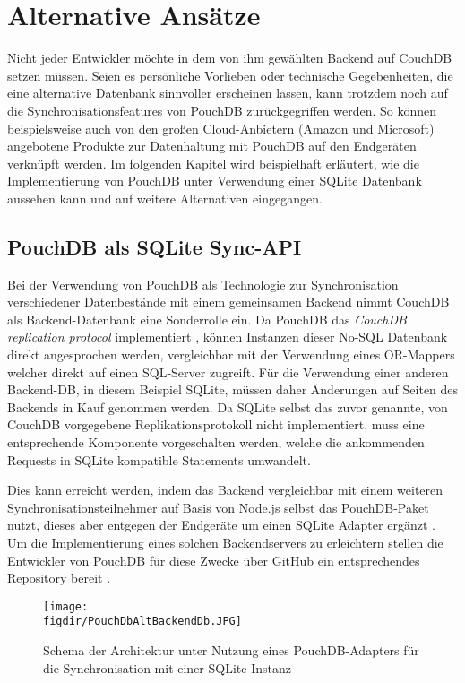 \chapter{Alternative Ansätze}
\label{Alternative Ansätze}

Nicht jeder Entwickler möchte in dem von ihm gewählten Backend auf CouchDB setzen müssen. Seien es persönliche Vorlieben oder technische Gegebenheiten, die eine alternative Datenbank sinnvoller erscheinen lassen, kann trotzdem noch auf die Synchronisationsfeatures von PouchDB zurückgegriffen werden. So können beispielsweise auch von den großen Cloud-Anbietern (Amazon und Microsoft) angebotene Produkte zur Datenhaltung mit PouchDB auf den Endgeräten verknüpft werden. Im folgenden Kapitel wird beispielhaft erläutert, wie die Implementierung von PouchDB unter Verwendung einer SQLite Datenbank aussehen kann und auf weitere Alternativen eingegangen.

\section{PouchDB als SQLite Sync-API}
Bei der Verwendung von PouchDB als Technologie zur Synchronisation verschiedener Datenbestände mit einem gemeinsamen Backend nimmt CouchDB als Backend-Datenbank eine Sonderrolle ein. Da PouchDB das \emph{CouchDB replication protocol} implementiert \cite{pouch:syncnoncouchdb}, können Instanzen dieser No-SQL Datenbank direkt angesprochen werden, vergleichbar mit der Verwendung eines OR-Mappers welcher direkt auf einen SQL-Server zugreift. Für die Verwendung einer anderen Backend-DB, in diesem Beispiel SQLite, müssen daher Änderungen auf Seiten des Backends in Kauf genommen werden. Da SQLite selbst das zuvor genannte, von CouchDB vorgegebene Replikationsprotokoll nicht implementiert, muss eine entsprechende Komponente vorgeschalten werden, welche die ankommenden Requests in SQLite kompatible Statements umwandelt.

Dies kann erreicht werden, indem das Backend vergleichbar mit einem weiteren Synchronisationsteilnehmer auf Basis von Node.js selbst das PouchDB-Paket nutzt, dieses aber entgegen der Endgeräte um einen SQLite Adapter ergänzt \cite{pouch:sqlliteplugin}. Um die Implementierung eines solchen Backendservers zu erleichtern stellen die Entwickler von PouchDB für diese Zwecke über GitHub ein entsprechendes Repository bereit \cite{pouch:pouchdbserver}.

\begin{figure}[htb]
	\centering
	\caption{Schema der Architektur unter Nutzung eines PouchDB-Adapters für die Synchronisation mit einer SQLite Instanz}
	\label{fig:pouchdbadapter}
	\texttt{[image: \\figdir/PouchDbAltBackendDb.JPG]}
\end{figure}

